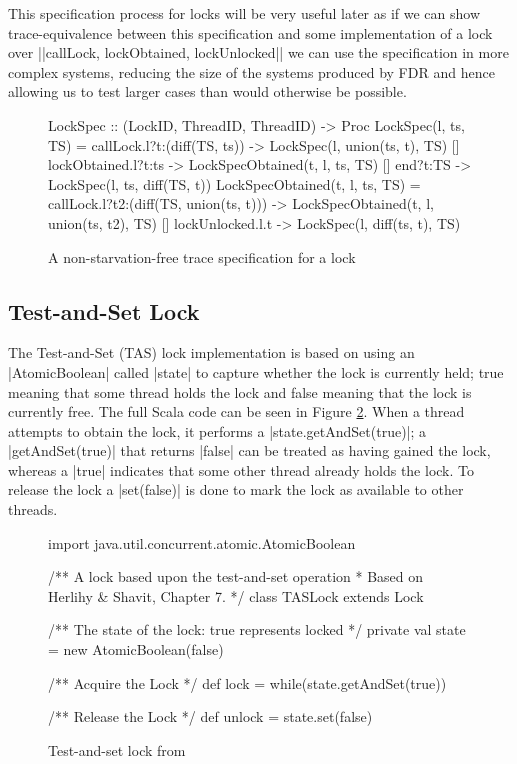 This specification process for locks will be very useful later as if we can show trace-equivalence between this specification and some implementation of a lock over |{|callLock, lockObtained, lockUnlocked|}| we can use the specification in more complex systems, reducing the size of the systems produced by FDR and hence allowing us to test larger cases than would otherwise be possible. 

\begin{figure}
\begin{cspm}
  LockSpec :: (LockID, {ThreadID}, {ThreadID}) -> Proc
  LockSpec(l, ts, TS) = callLock.l?t:(diff(TS, ts)) -> LockSpec(l, union(ts, {t}), TS)
                  [] lockObtained.l?t:ts -> LockSpecObtained(t, l, ts, TS)
                  [] end?t:TS -> LockSpec(l, ts, diff(TS, {t}))
  LockSpecObtained(t, l, ts, TS) = callLock.l?t2:(diff(TS, union(ts, {t}))) -> 
                                        LockSpecObtained(t, l, union(ts, {t2}), TS)
                  [] lockUnlocked.l.t -> LockSpec(l, diff(ts, {t}), TS)

\end{cspm}
\caption{A non-starvation-free trace specification for a lock}
\label{code:LockSpec}
\end{figure}

\subsection{Test-and-Set Lock}

The Test-and-Set (TAS) lock implementation is based on using an |AtomicBoolean| called |state| to capture whether the lock is currently held; true meaning that some thread holds the lock and false meaning that the lock is currently free. The full Scala code can be seen in Figure \ref{fig:TASScala}. When a thread attempts to obtain the lock, it performs a |state.getAndSet(true)|; a |getAndSet(true)| that returns |false| can be treated as having gained the lock, whereas a |true| indicates that some other thread already holds the lock. To release the lock a |set(false)| is done to mark the lock as available to other threads.

\begin{figure}
  \begin{scala}
  import java.util.concurrent.atomic.AtomicBoolean

  /** A lock based upon the test-and-set operation 
    * Based on Herlihy & Shavit, Chapter 7. */
  class TASLock extends Lock{
    /** The state of the lock: true represents locked */
    private val state = new AtomicBoolean(false)

    /** Acquire the Lock */ 
    def lock = while(state.getAndSet(true)){ }

    /** Release the Lock */
    def unlock = state.set(false)
  }
  \end{scala}
  \caption{Test-and-set lock from \cite{CADS-4}  \label{fig:TASScala}}
\end{figure}

